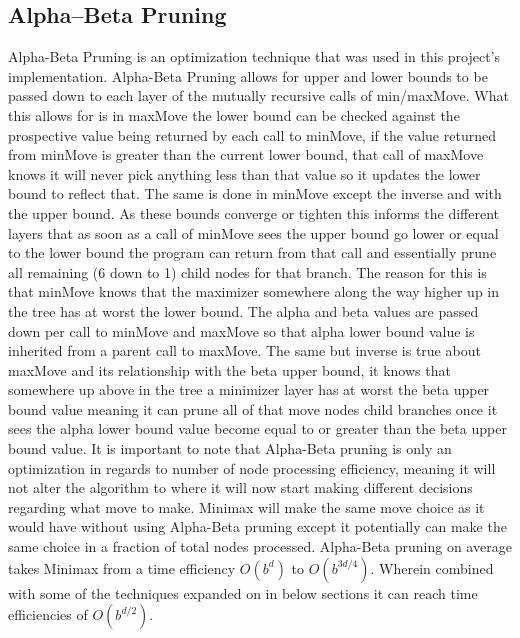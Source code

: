 \documentclass[conference]{IEEEtran}
\begin{document}
\subsection{Alpha--Beta Pruning}
Alpha-Beta Pruning is an optimization technique that was used in this project's implementation. Alpha-Beta Pruning allows for upper and lower bounds to be passed down to each layer of the mutually recursive calls of min/maxMove. What this allows for is in maxMove the lower bound can be checked against the prospective value being returned by each call to minMove, if the value returned from minMove is greater than the current lower bound, that call of maxMove knows it will never pick anything less than that value so it updates the lower bound to reflect that. The same is done in minMove except the inverse and with the upper bound. As these bounds converge or tighten this informs the different layers that as soon as a call of minMove sees the upper bound go lower or equal to the lower bound the program can return from that call and essentially prune all remaining (6 down to 1) child nodes for that branch. The reason for this is that minMove knows that the maximizer somewhere along the way higher up in the tree has at worst the lower bound. The alpha and beta values are passed down per call to minMove and maxMove so that alpha lower bound value is inherited from a parent call to maxMove. The same but inverse is true about maxMove and its relationship with the beta upper bound, it knows that somewhere up above in the tree a minimizer layer has at worst the beta upper bound value meaning it can prune all of that move nodes child branches once it sees the alpha lower bound value become equal to or greater than the beta upper bound value. It is important to note that Alpha-Beta pruning is only an optimization in regards to number of node processing efficiency, meaning it will not alter the algorithm to where it will now start making different decisions regarding what move to make. Minimax will make the same move choice as it would have without using Alpha-Beta pruning except it potentially can make the same choice in a fraction of total nodes processed. Alpha-Beta pruning on average takes Minimax from a time efficiency $O(b^d)$ to $O(b^{3d/4})$. Wherein combined with some of the techniques expanded on in below sections it can reach time efficiencies of $O(b^{d/2})$.
\end{document}
